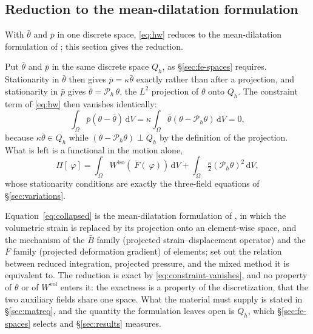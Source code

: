 \documentclass[11pt]{article}
\newcommand{\F}{~F}
\newcommand{\disp}{~\varphi}
\newcommand{\diff}{\,\mathrm{d}}
\newcommand{\supvol}{^{\mathrm{vol}}}
\newcommand{\supiso}{^{\mathrm{iso}}}
\theoremstyle{definition}
\theoremstyle{plain}
\begin{document}
\subsection{Reduction to the mean-dilatation formulation}
\label{sec:meandilatation}

With $\bar\theta$ and $\bar p$ in one discrete space, \eqref{eq:hw} reduces to
the mean-dilatation formulation of \citet{SimoTaylorPister:1985}; this section
gives the reduction.

Put $\bar\theta$ and $\bar p$ in the same discrete space $Q_h$, as
\S\ref{sec:fe-spaces} requires. Stationarity in $\bar\theta$
then gives $\bar p = \kappa\bar\theta$ exactly rather than after a
projection, and stationarity in $\bar p$ gives $\bar\theta = \mathcal{P}_h\,\theta$,
the $L^2$ projection of $\theta$ onto $Q_h$. The constraint term of
\eqref{eq:hw} then vanishes identically:
\begin{equation}
  \label{eq:constraint-vanishes}
  \int_\Omega \bar p \left(\theta - \bar\theta\right) \diff V
  = \kappa \int_\Omega \bar\theta \left(\theta - \mathcal{P}_h \theta\right) \diff V = 0,
\end{equation}
because $\kappa\bar\theta \in Q_h$ while $(\theta - \mathcal{P}_h\theta) \perp Q_h$ by
the definition of the projection. What is left is a functional in the motion
alone,
\begin{equation}
  \label{eq:collapsed}
  \Pi[\disp] = \int_\Omega W\supiso\!\left(\bar{\F}(\disp)\right) \diff V
             + \int_\Omega \tfrac{\kappa}{2}\left(\mathcal{P}_h \theta\right)^2 \diff V,
\end{equation}
whose stationarity conditions are exactly the three-field equations of
\S\ref{sec:variations}.

Equation~\eqref{eq:collapsed} is the mean-dilatation formulation of
\citet{SimoTaylorPister:1985}, in which the volumetric strain is replaced by
its projection onto an element-wise space, and the mechanism of the $\bar B$
family (projected strain--displacement operator) and the $\bar F$ family
(projected deformation gradient) of elements; \citet[\S8.12]{BoffiBrezziFortin:2013}
set out the relation between reduced integration, projected pressure, and the
mixed method it is equivalent to. The reduction is exact by
\eqref{eq:constraint-vanishes}, and no property of $\theta$ or of
$W\supvol$ enters it: the exactness is a property of the discretization, that
the two auxiliary fields share one space. What the material must supply is
stated in \S\ref{sec:matreq}, and the quantity the formulation leaves open is
$Q_h$, which \S\ref{sec:fe-spaces} selects and \S\ref{sec:results} measures.
\end{document}
